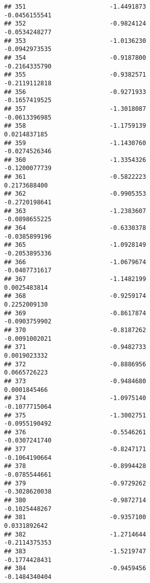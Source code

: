 \documentclass[
]{article}
\begin{document}
\begin{verbatim}
## 351                       -1.4491873                         -0.0456155541
## 352                       -0.9824124                         -0.0534248277
## 353                       -1.0136230                         -0.0942973535
## 354                       -0.9187800                         -0.2164335790
## 355                       -0.9382571                         -0.2119112818
## 356                       -0.9271933                         -0.1657419525
## 357                       -1.3018087                         -0.0613396985
## 358                       -1.1759139                          0.0214837185
## 359                       -1.1430760                         -0.0274526346
## 360                       -1.3354326                         -0.1200077739
## 361                       -0.5822223                          0.2173688400
## 362                       -0.9905353                         -0.2720198641
## 363                       -1.2383607                         -0.0898655225
## 364                       -0.6330378                         -0.0385899196
## 365                       -1.0928149                         -0.2053895336
## 366                       -1.0679674                         -0.0407731617
## 367                       -1.1482199                          0.0025483814
## 368                       -0.9259174                          0.2252009130
## 369                       -0.8617874                         -0.0903759902
## 370                       -0.8187262                         -0.0091002021
## 371                       -0.9482733                          0.0019023332
## 372                       -0.8886956                          0.0665726223
## 373                       -0.9484680                          0.0001845466
## 374                       -1.0975140                         -0.1077715064
## 375                       -1.3002751                         -0.0955190492
## 376                       -0.5546261                         -0.0307241740
## 377                       -0.8247171                         -0.1064190664
## 378                       -0.8994428                         -0.0785544661
## 379                       -0.9729262                         -0.3028620038
## 380                       -0.9872714                         -0.1025448267
## 381                       -0.9357100                          0.0331892642
## 382                       -1.2714644                         -0.2114375353
## 383                       -1.5219747                         -0.1774428431
## 384                       -0.9459456                         -0.1484340404

\end{verbatim}
\end{document}
